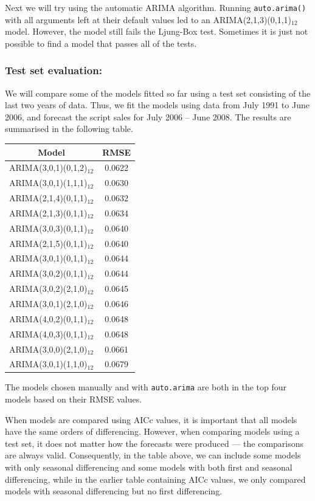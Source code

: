 \documentclass[]{book}
\begin{document}
Next we will try using the automatic ARIMA algorithm. Running \texttt{auto.arima()} with all arguments left at their default values led to an ARIMA(2,1,3)(0,1,1)\(_{12}\) model. However, the model still fails the Ljung-Box test. Sometimes it is just not possible to find a model that passes all of the tests.

\hypertarget{test-set-evaluation}{%
\subsubsection*{Test set evaluation:}\label{test-set-evaluation}}

We will compare some of the models fitted so far using a test set consisting of the last two years of data. Thus, we fit the models using data from July 1991 to June 2006, and forecast the script sales for July 2006 -- June 2008. The results are summarised in the following table.

\begin{longtable}[]{@{}cc@{}}
\toprule
Model & RMSE\tabularnewline
\midrule
\endhead
ARIMA(3,0,1)(0,1,2)\(_{12}\) & 0.0622\tabularnewline
ARIMA(3,0,1)(1,1,1)\(_{12}\) & 0.0630\tabularnewline
ARIMA(2,1,4)(0,1,1)\(_{12}\) & 0.0632\tabularnewline
ARIMA(2,1,3)(0,1,1)\(_{12}\) & 0.0634\tabularnewline
ARIMA(3,0,3)(0,1,1)\(_{12}\) & 0.0640\tabularnewline
ARIMA(2,1,5)(0,1,1)\(_{12}\) & 0.0640\tabularnewline
ARIMA(3,0,1)(0,1,1)\(_{12}\) & 0.0644\tabularnewline
ARIMA(3,0,2)(0,1,1)\(_{12}\) & 0.0644\tabularnewline
ARIMA(3,0,2)(2,1,0)\(_{12}\) & 0.0645\tabularnewline
ARIMA(3,0,1)(2,1,0)\(_{12}\) & 0.0646\tabularnewline
ARIMA(4,0,2)(0,1,1)\(_{12}\) & 0.0648\tabularnewline
ARIMA(4,0,3)(0,1,1)\(_{12}\) & 0.0648\tabularnewline
ARIMA(3,0,0)(2,1,0)\(_{12}\) & 0.0661\tabularnewline
ARIMA(3,0,1)(1,1,0)\(_{12}\) & 0.0679\tabularnewline
\bottomrule
\end{longtable}

The models chosen manually and with \texttt{auto.arima} are both in the top four models based on their RMSE values.

When models are compared using AICc values, it is important that all models have the same orders of differencing. However, when comparing models using a test set, it does not matter how the forecasts were produced --- the comparisons are always valid. Consequently, in the table above, we can include some models with only seasonal differencing and some models with both first and seasonal differencing, while in the earlier table containing AICc values, we only compared models with seasonal differencing but no first differencing.
\end{document}
